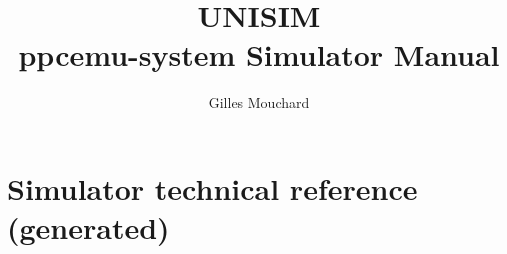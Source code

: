 \documentclass[a4paper,11pt]{article}
\begin{document}
\title{UNISIM\\ ppcemu-system Simulator Manual}
\author{Gilles Mouchard}
\date{}

\maketitle
\section{Simulator technical reference (generated)}

\end{document}

